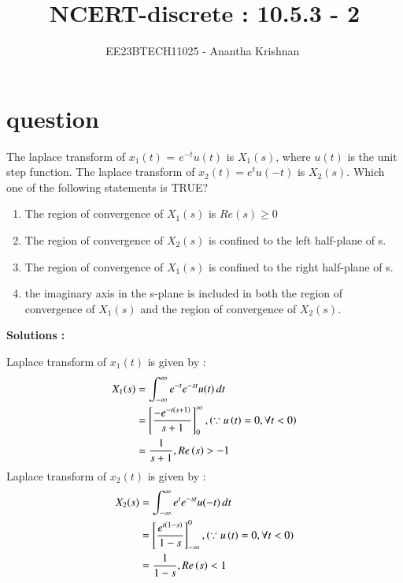 \documentclass[journal,12pt,onecolumn]{IEEEtran}
\theoremstyle{remark}
\begin{document}

\vspace{3cm}

\title{NCERT-discrete : 10.5.3 - 2}
\author{EE23BTECH11025 - Anantha Krishnan $^{}$%
}
\maketitle
\bigskip



\section{question}

The laplace transform of $x_1(t)$ = $e^{-t}u(t)$ is $X_1(s)$, where $u(t)$ is the unit step function. The laplace transform of $x_2(t) = e^tu(-t)$ is $X_2(s)$. Which one of the following statements is TRUE?
\begin{enumerate}
    \item The region of convergence of $X_1(s)$ is $Re(s) \geq 0$
    \item The region of convergence of $X_2(s)$ is confined to the left half-plane of s.
    \item The region of convergence of $X_1(s)$ is confined to the right half-plane of s.
    \item the imaginary axis in the s-plane is included in both the region of convergence of $X_1(s)$ and the region of convergence of $X_2(s)$.
\end{enumerate}
 



\textbf{Solutions :}
    
Laplace transform of $x_1(t)$ is given by :
\begin{align}
    X_1(s) &=  \int_{-\infty}^{\infty} e^{-t}e^{-st}u(t) \,dt\\
       &=  \left[\frac{-e^{-t\left(s+1\right)}}{s+1}\right]_{0}^{\infty} , \left(\because u\left(t\right) =0 ,\forall t<0\right)\\ 
&= \frac{1}{s+1} , Re\left(s\right) > -1
\end{align}
Laplace transform of $x_2(t)$ is given by :
\begin{align}
    X_2(s) &=  \int_{-\infty}^{\infty} e^{t}e^{-st}u(-t) \,dt\\
     &=  \left[\frac{e^{t\left(1-s\right)}}{1-s}\right]_{-\infty}^{0} , \left(\because u\left(t\right) =0 ,\forall t<0\right)\\
&= \frac{1}{1-s} , Re\left(s\right) < 1
\end{align}
\end{document}
